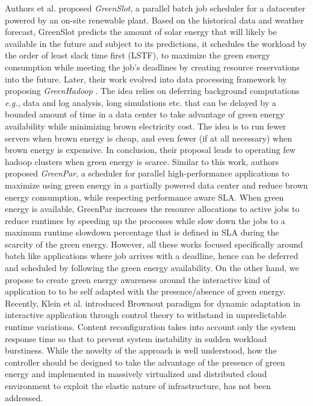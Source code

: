 Authors et al. \cite{GreenSlot} proposed \emph{GreenSlot}, a parallel batch job scheduler for a datacenter powered by an on-site renewable plant. Based on the historical data and weather forecast, GreenSlot predicts the amount of solar energy that will likely be available in the future and subject to its predictions, it schedules the workload by the order of least slack time first (LSTF), to maximize the green energy consumption while meeting the job's deadlines by creating resource reservations into the future. Later, their work evolved into data processing framework by proposing \emph{GreenHadoop} \cite{GreenHadoop}. The idea relies on deferring background
computations \emph{e.g.,} data and log analysis, long simulations etc. that can be delayed by a bounded amount of time in a data center to take advantage of green energy availability while minimizing brown electricity cost. The idea is to run fewer servers when brown energy is cheap, and even fewer (if at all necessary) when brown energy is expensive. In conclusion, their proposal leads to operating few
hadoop clusters when green energy is scarce. 
Similar to this work, authors \cite{GreenPar} proposed \emph{GreenPar}, a scheduler for parallel high-performance applications to maximize using green energy in a partially powered data center and reduce brown energy consumption, while respecting performance aware SLA.  When green energy is available, GreenPar increases the resource allocations to active jobs to reduce runtimes by speeding up the processes while slow down the jobs to a maximum runtime slowdown percentage that is defined in SLA during the scarcity of the green energy. However, all these works focused specifically around batch like applications where job arrives with a deadline, hence can be deferred and scheduled by following the green energy availability. On the other hand, we propose to create green energy awareness around the interactive kind of application to to be self adapted with the presence/absence of green energy. Recently, Klein et al. \cite{brownout} introduced Brownout paradigm for dynamic adaptation in interactive application through control theory to withstand in
unpredictable runtime variations. Content reconfiguration takes into account only the system response time so that to prevent system instability in sudden workload burstiness. While the novelty of the approach is well understood,
how the controller should be designed to take the advantage of the presence of green energy and 
implemented in
massively virtualized and distributed cloud environment to exploit the elastic nature of infrastructure,
has not been addressed.

